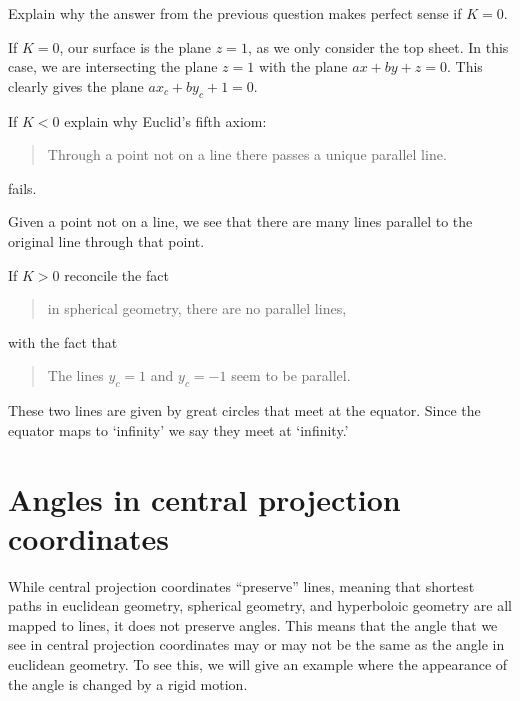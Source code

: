 \documentclass{ximera}
\begin{document}
\begin{problem}
  Explain why the answer from the previous question makes perfect sense if $K=0$.
  \begin{freeResponse}
    If $K=0$, our surface is the plane $z=1$, as we only consider the
    top sheet. In this case, we are intersecting the plane $z=1$ with
    the plane $ax+by+z=0$. This clearly gives the plane $ax_c+ by_c +
    1 = 0.$
  \end{freeResponse}
\end{problem}

\begin{problem}
  If $K<0$ explain why Euclid's fifth axiom:
  \begin{quote}
    Through a point not on a line there passes a unique parallel line.
  \end{quote}
  fails.
  \begin{freeResponse}
    Given a point not on a line, we see that there are many lines
    parallel to the original line through that point.
  \end{freeResponse}
\end{problem}

\begin{problem}
  If $K>0$ reconcile the fact
  \begin{quote}
    in spherical geometry, there are no parallel lines,
  \end{quote}
  with the fact that 
  \begin{quote}
    The lines $y_c=1$ and $y_c = -1$ seem to be parallel.
  \end{quote}
  \begin{freeResponse}
    These two lines are given by great circles that meet at the
    equator. Since the equator maps to `infinity' we say they meet at
    `infinity.'
  \end{freeResponse}
\end{problem}

\section{Angles in central projection coordinates}

While central projection coordinates ``preserve'' lines, meaning that
shortest paths in euclidean geometry, spherical geometry, and
hyperboloic geometry are all mapped to lines, it does not preserve
angles. This means that the angle that we see in central projection
coordinates may or may not be the same as the angle in euclidean
geometry. To see this, we will give an example where the appearance of
the angle is changed by a rigid motion.
\end{document}
